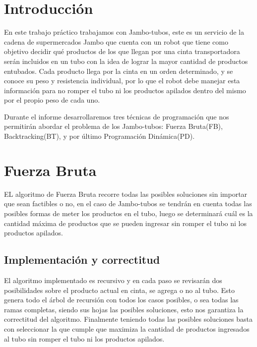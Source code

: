 \documentclass[10pt,a4paper]{article}
\begin{document}

\subtitulo{}

\fecha{\today}



\maketitle

\tableofcontents

\newpage

\setcounter{page}{1}

\section{Introducción} \label{sec:introduccion}
En este trabajo práctico trabajamos con Jambo-tubos, este es un servicio de la cadena de supermercados Jambo que cuenta con un robot que tiene como objetivo decidir qué productos de los que llegan por una cinta transportadora serán incluidos en un tubo con la idea de lograr la mayor cantidad de productos entubados. Cada producto llega por la cinta en un orden determinado, y se conoce su peso y resistencia individual, por lo que el robot debe manejar esta información para no romper el tubo ni los productos apilados dentro del mismo por el propio peso de cada uno. \cite{ref:enunciado}

Durante el informe desarrollaremos tres técnicas de programación que nos permitirán abordar el problema de los Jambo-tubos: Fuerza Bruta(FB), Backtracking(BT), y por último Programación Dinámica(PD).

\section{Fuerza Bruta} \label{sec:fuerza_bruta}
EL algoritmo de Fuerza Bruta recorre todas las posibles soluciones sin importar que sean factibles o no, en el caso de Jambo-tubos se tendrán en cuenta todas las posibles formas de meter los productos en el tubo, luego se determinará cuál es la cantidad máxima de productos que se pueden ingresar sin romper el tubo ni los productos apilados.

\subsection{Implementación y correctitud}
El algoritmo implementado es recursivo y en cada paso se revisarán dos posibilidades sobre el producto actual en cinta, se agrega o no al tubo. Esto genera todo el árbol de recursión con todos los casos posibles, o sea todas las ramas completas, siendo sus hojas las posibles soluciones, esto nos garantiza la correctitud del algoritmo. Finalmente teniendo todas las posibles soluciones basta con seleccionar la que cumple que maximiza la cantidad de productos ingresados al tubo sin romper el tubo ni los productos apilados.
\end{document}
